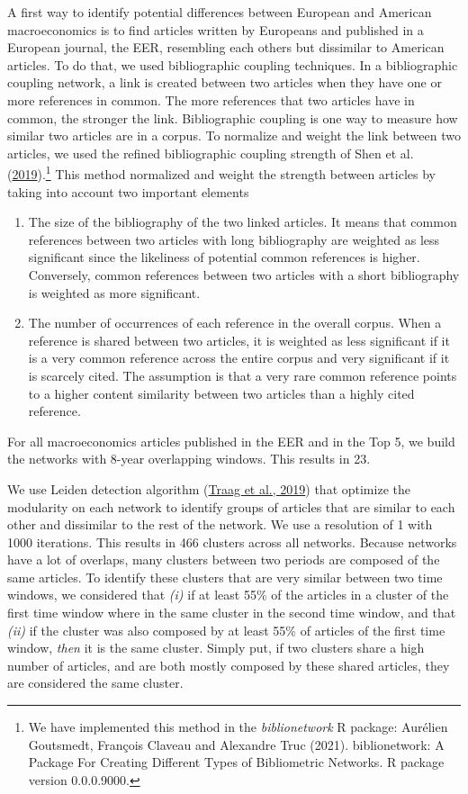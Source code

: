 \documentclass[
  12pt,
  onecolumn]{article}
\providecommand{\tightlist}{%
  \setlength{\itemsep}{0pt}\setlength{\parskip}{0pt}}
\begin{document}
A first way to identify potential differences between European and American macroeconomics is to find articles written by Europeans and published in a European journal, the EER, resembling each others but dissimilar to American articles. To do that, we used bibliographic coupling techniques. In a bibliographic coupling network, a link is created between two articles when they have one or more references in common. The more references that two articles have in common, the stronger the link. Bibliographic coupling is one way to measure how similar two articles are in a corpus. To normalize and weight the link between two articles, we used the refined bibliographic coupling strength of Shen et al. (\protect\hyperlink{ref-shen2019}{2019}).\footnote{We have implemented this method in the \emph{biblionetwork} R package: Aurélien Goutsmedt, François Claveau and Alexandre Truc (2021). biblionetwork: A Package For Creating Different Types of Bibliometric Networks. R package version 0.0.0.9000.} This method normalized and weight the strength between articles by taking into account two important elements

\begin{enumerate}
\def\labelenumi{\arabic{enumi}.}
\tightlist
\item
  The size of the bibliography of the two linked articles. It means that common references between two articles with long bibliography are weighted as less significant since the likeliness of potential common references is higher. Conversely, common references between two articles with a short bibliography is weighted as more significant.
\item
  The number of occurrences of each reference in the overall corpus. When a reference is shared between two articles, it is weighted as less significant if it is a very common reference across the entire corpus and very significant if it is scarcely cited. The assumption is that a very rare common reference points to a higher content similarity between two articles than a highly cited reference.
\end{enumerate}

For all macroeconomics articles published in the EER and in the Top 5, we build the networks with 8-year overlapping windows. This results in 23.

We use Leiden detection algorithm (\protect\hyperlink{ref-traag2019}{Traag et al., 2019}) that optimize the modularity on each network to identify groups of articles that are similar to each other and dissimilar to the rest of the network. We use a resolution of 1 with 1000 iterations. This results in 466 clusters across all networks. Because networks have a lot of overlaps, many clusters between two periods are composed of the same articles. To identify these clusters that are very similar between two time windows, we considered that \emph{(i)} if at least 55\% of the articles in a cluster of the first time window where in the same cluster in the second time window, and that \emph{(ii)} if the cluster was also composed by at least 55\% of articles of the first time window, \emph{then} it is the same cluster. Simply put, if two clusters share a high number of articles, and are both mostly composed by these shared articles, they are considered the same cluster.
\end{document}
